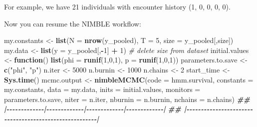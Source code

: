 \documentclass[
  12pt,
]{krantz}
\newenvironment{Shaded}{\begin{snugshade}}{\end{snugshade}}
\newcommand{\AttributeTok}[1]{\textcolor[rgb]{0.13,0.29,0.53}{#1}}
\newcommand{\CommentTok}[1]{\textcolor[rgb]{0.56,0.35,0.01}{\textit{#1}}}
\newcommand{\ControlFlowTok}[1]{\textcolor[rgb]{0.13,0.29,0.53}{\textbf{#1}}}
\newcommand{\DecValTok}[1]{\textcolor[rgb]{0.00,0.00,0.81}{#1}}
\newcommand{\DocumentationTok}[1]{\textcolor[rgb]{0.56,0.35,0.01}{\textbf{\textit{#1}}}}
\newcommand{\FunctionTok}[1]{\textcolor[rgb]{0.13,0.29,0.53}{\textbf{#1}}}
\newcommand{\NormalTok}[1]{#1}
\newcommand{\OtherTok}[1]{\textcolor[rgb]{0.56,0.35,0.01}{#1}}
\newcommand{\SpecialCharTok}[1]{\textcolor[rgb]{0.81,0.36,0.00}{\textbf{#1}}}
\newcommand{\StringTok}[1]{\textcolor[rgb]{0.31,0.60,0.02}{#1}}
\begin{document}
For example, we have 21 individuals with encounter history (1, 0, 0, 0, 0).

Now you can resume the NIMBLE workflow:

\begin{Shaded}
\begin{Highlighting}[]
\NormalTok{my.constants }\OtherTok{\textless{}{-}} \FunctionTok{list}\NormalTok{(}\AttributeTok{N =} \FunctionTok{nrow}\NormalTok{(y\_pooled), }\AttributeTok{T =} \DecValTok{5}\NormalTok{, }\AttributeTok{size =}\NormalTok{ y\_pooled[,}\StringTok{\textquotesingle{}size\textquotesingle{}}\NormalTok{])}
\NormalTok{my.data }\OtherTok{\textless{}{-}} \FunctionTok{list}\NormalTok{(}\AttributeTok{y =}\NormalTok{ y\_pooled[,}\SpecialCharTok{{-}}\DecValTok{1}\NormalTok{] }\SpecialCharTok{+} \DecValTok{1}\NormalTok{) }\CommentTok{\# delete size from dataset}
\NormalTok{initial.values }\OtherTok{\textless{}{-}} \ControlFlowTok{function}\NormalTok{() }\FunctionTok{list}\NormalTok{(}\AttributeTok{phi =} \FunctionTok{runif}\NormalTok{(}\DecValTok{1}\NormalTok{,}\DecValTok{0}\NormalTok{,}\DecValTok{1}\NormalTok{),}
                                  \AttributeTok{p =} \FunctionTok{runif}\NormalTok{(}\DecValTok{1}\NormalTok{,}\DecValTok{0}\NormalTok{,}\DecValTok{1}\NormalTok{))}
\NormalTok{parameters.to.save }\OtherTok{\textless{}{-}} \FunctionTok{c}\NormalTok{(}\StringTok{"phi"}\NormalTok{, }\StringTok{"p"}\NormalTok{)}
\NormalTok{n.iter }\OtherTok{\textless{}{-}} \DecValTok{5000}
\NormalTok{n.burnin }\OtherTok{\textless{}{-}} \DecValTok{1000}
\NormalTok{n.chains }\OtherTok{\textless{}{-}} \DecValTok{2}
\NormalTok{start\_time }\OtherTok{\textless{}{-}} \FunctionTok{Sys.time}\NormalTok{()}
\NormalTok{mcmc.output }\OtherTok{\textless{}{-}} \FunctionTok{nimbleMCMC}\NormalTok{(}\AttributeTok{code =}\NormalTok{ hmm.survival,}
                          \AttributeTok{constants =}\NormalTok{ my.constants,}
                          \AttributeTok{data =}\NormalTok{ my.data,}
                          \AttributeTok{inits =}\NormalTok{ initial.values,}
                          \AttributeTok{monitors =}\NormalTok{ parameters.to.save,}
                          \AttributeTok{niter =}\NormalTok{ n.iter,}
                          \AttributeTok{nburnin =}\NormalTok{ n.burnin,}
                          \AttributeTok{nchains =}\NormalTok{ n.chains)}
\DocumentationTok{\#\# |{-}{-}{-}{-}{-}{-}{-}{-}{-}{-}{-}{-}{-}|{-}{-}{-}{-}{-}{-}{-}{-}{-}{-}{-}{-}{-}|{-}{-}{-}{-}{-}{-}{-}{-}{-}{-}{-}{-}{-}|{-}{-}{-}{-}{-}{-}{-}{-}{-}{-}{-}{-}{-}|}
\DocumentationTok{\#\# |{-}{-}{-}{-}{-}{-}{-}{-}{-}{-}{-}{-}{-}{-}{-}{-}{-}{-}{-}{-}{-}{-}{-}{-}{-}{-}{-}{-}{-}{-}{-}{-}{-}{-}{-}{-}{-}{-}{-}{-}{-}{-}{-}{-}{-}{-}{-}{-}{-}{-}{-}{-}{-}{-}{-}|}

\end{Highlighting}
\end{Shaded}
\end{document}
